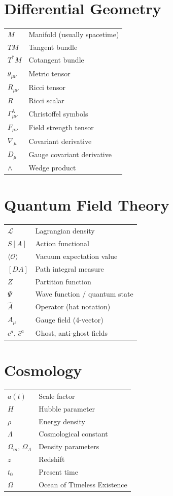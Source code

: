 \section{Differential Geometry}

\begin{tabular}{ll}
$M$ & Manifold (usually spacetime) \\
$TM$ & Tangent bundle \\
$T^*M$ & Cotangent bundle \\
$g_{\mu\nu}$ & Metric tensor \\
$R_{\mu\nu}$ & Ricci tensor \\
$R$ & Ricci scalar \\
$\Gamma^\lambda_{\mu\nu}$ & Christoffel symbols \\
$F_{\mu\nu}$ & Field strength tensor \\
$\nabla_\mu$ & Covariant derivative \\
$D_\mu$ & Gauge covariant derivative \\
$\wedge$ & Wedge product \\
\end{tabular}

\section{Quantum Field Theory}

\begin{tabular}{ll}
$\mathcal{L}$ & Lagrangian density \\
$S[A]$ & Action functional \\
$\langle \mathcal{O} \rangle$ & Vacuum expectation value \\
$[DA]$ & Path integral measure \\
$Z$ & Partition function \\
$\Psi$ & Wave function / quantum state \\
$\hat{A}$ & Operator (hat notation) \\
$A_\mu$ & Gauge field (4-vector) \\
$c^a$, $\bar{c}^a$ & Ghost, anti-ghost fields \\
\end{tabular}

\section{Cosmology}

\begin{tabular}{ll}
$a(t)$ & Scale factor \\
$H$ & Hubble parameter \\
$\rho$ & Energy density \\
$\Lambda$ & Cosmological constant \\
$\Omega_m$, $\Omega_\Lambda$ & Density parameters \\
$z$ & Redshift \\
$t_0$ & Present time \\
$\Omega$ & Ocean of Timeless Existence \\
\end{tabular}

